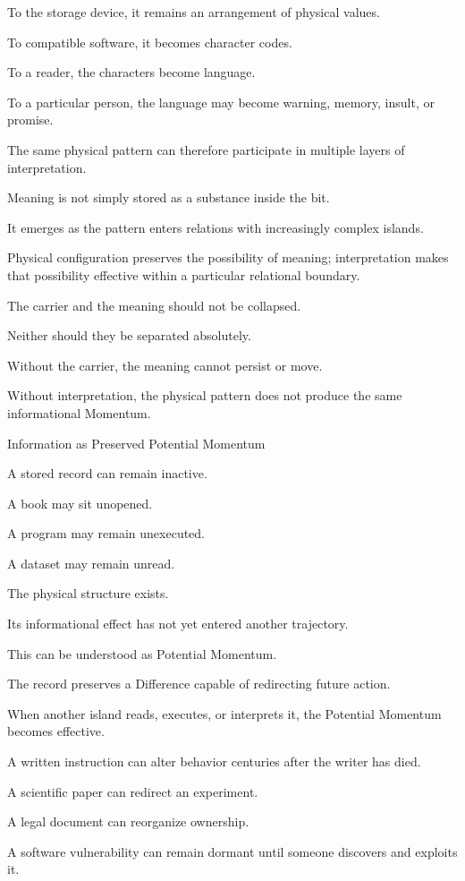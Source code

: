 To the storage device, it remains an arrangement of physical values.

To compatible software, it becomes character codes.

To a reader, the characters become language.

To a particular person, the language may become warning, memory, insult, or promise.

The same physical pattern can therefore participate in multiple layers of interpretation.

Meaning is not simply stored as a substance inside the bit.

It emerges as the pattern enters relations with increasingly complex islands.

Physical configuration preserves the possibility of meaning; interpretation makes that possibility effective within a particular relational boundary.

The carrier and the meaning should not be collapsed.

Neither should they be separated absolutely.

Without the carrier, the meaning cannot persist or move.

Without interpretation, the physical pattern does not produce the same informational Momentum.

Information as Preserved Potential Momentum

A stored record can remain inactive.

A book may sit unopened.

A program may remain unexecuted.

A dataset may remain unread.

The physical structure exists.

Its informational effect has not yet entered another trajectory.

This can be understood as Potential Momentum.

The record preserves a Difference capable of redirecting future action.

When another island reads, executes, or interprets it, the Potential Momentum becomes effective.

A written instruction can alter behavior centuries after the writer has died.

A scientific paper can redirect an experiment.

A legal document can reorganize ownership.

A software vulnerability can remain dormant until someone discovers and exploits it.

